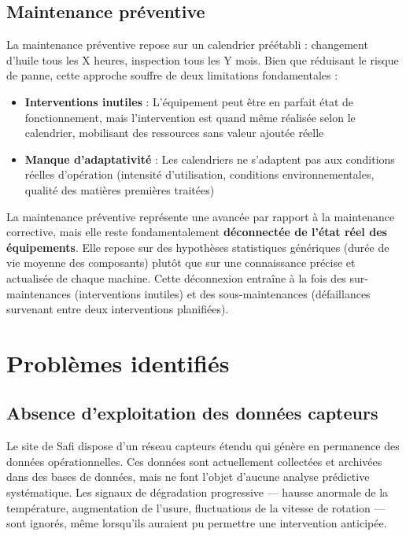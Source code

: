 \documentclass[a4paper,12pt]{report}
\begin{document}
\subsection{Maintenance préventive}

La maintenance préventive repose sur un calendrier préétabli : changement d'huile tous les X heures, inspection tous les Y mois. Bien que réduisant le risque de panne, cette approche souffre de deux limitations fondamentales :

\begin{itemize}
    \item \textbf{Interventions inutiles} : L'équipement peut être en parfait état de fonctionnement, mais l'intervention est quand même réalisée selon le calendrier, mobilisant des ressources sans valeur ajoutée réelle
    \item \textbf{Manque d'adaptativité} : Les calendriers ne s'adaptent pas aux conditions réelles d'opération (intensité d'utilisation, conditions environnementales, qualité des matières premières traitées)
\end{itemize}

La maintenance préventive représente une avancée par rapport à la maintenance corrective, mais elle reste fondamentalement \textbf{déconnectée de l'état réel des équipements}. Elle repose sur des hypothèses statistiques génériques (durée de vie moyenne des composants) plutôt que sur une connaissance précise et actualisée de chaque machine. Cette déconnexion entraîne à la fois des sur-maintenances (interventions inutiles) et des sous-maintenances (défaillances survenant entre deux interventions planifiées).

\section{Problèmes identifiés}

\subsection{Absence d'exploitation des données capteurs}

Le site de Safi dispose d'un réseau capteurs étendu qui génère en permanence des données opérationnelles. Ces données sont actuellement collectées et archivées dans des bases de données, mais ne font l'objet d'aucune analyse prédictive systématique. Les signaux de dégradation progressive — hausse anormale de la température, augmentation de l'usure, fluctuations de la vitesse de rotation — sont ignorés, même lorsqu'ils auraient pu permettre une intervention anticipée.
\end{document}

